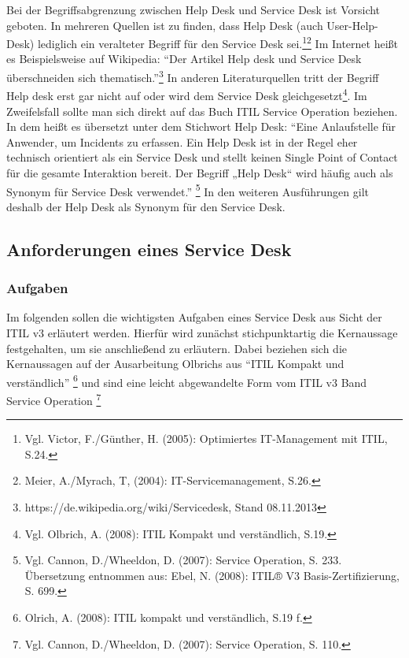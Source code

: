 \noindent
Bei der Begriffsabgrenzung zwischen Help Desk und Service Desk ist Vorsicht geboten. In mehreren Quellen ist zu finden, dass Help Desk (auch User-Help-Desk) lediglich ein veralteter Begriff für den Service Desk sei.\footnote{Vgl. Victor, F./Günther, H. (2005): Optimiertes
IT-Management mit ITIL, S.24.}\footnote{Meier, A./Myrach, T, (2004): IT-Servicemanagement, S.26.} Im Internet heißt es Beispielsweise auf Wikipedia: \enquote{Der Artikel Help desk und Service Desk überschneiden sich thematisch.}\footnote{https://de.wikipedia.org/wiki/Servicedesk, Stand 08.11.2013} In anderen Literaturquellen tritt der Begriff Help desk erst gar nicht auf oder wird dem Service Desk gleichgesetzt\footnote{Vgl. Olbrich, A. (2008): ITIL Kompakt und verständlich, S.19.}. Im Zweifelsfall sollte man sich direkt auf das Buch ITIL Service Operation beziehen. In dem heißt es übersetzt unter dem Stichwort Help Desk:
\enquote{Eine Anlaufstelle für Anwender, um Incidents zu erfassen. Ein Help Desk ist in der
Regel eher technisch orientiert als ein Service Desk und stellt keinen Single Point
of Contact für die gesamte Interaktion bereit. Der Begriff „Help Desk“ wird häufig
auch als Synonym für Service Desk verwendet.} \footnote{Vgl. Cannon, D./Wheeldon, D. (2007): Service Operation, S. 233. Übersetzung entnommen aus: Ebel, N. (2008): ITIL® V3 Basis-Zertifizierung, S. 699.} \newline
In den weiteren Ausführungen gilt deshalb der Help Desk als Synonym für den Service Desk.



\subsection{Anforderungen eines Service Desk}

\subsubsection{Aufgaben}
\noindent
Im folgenden sollen die wichtigsten Aufgaben eines Service Desk aus Sicht der ITIL v3 erläutert werden. Hierfür wird zunächst stichpunktartig die Kernaussage festgehalten, um sie anschließend zu erläutern. Dabei beziehen sich die Kernaussagen auf der Ausarbeitung Olbrichs aus \enquote{ITIL Kompakt und verständlich}
\footnote{Olrich, A. (2008): ITIL kompakt und verständlich, S.19 f.}
und sind eine leicht abgewandelte Form vom ITIL v3 Band Service Operation \footnote{Vgl. Cannon, D./Wheeldon, D. (2007): Service Operation, S. 110.}

